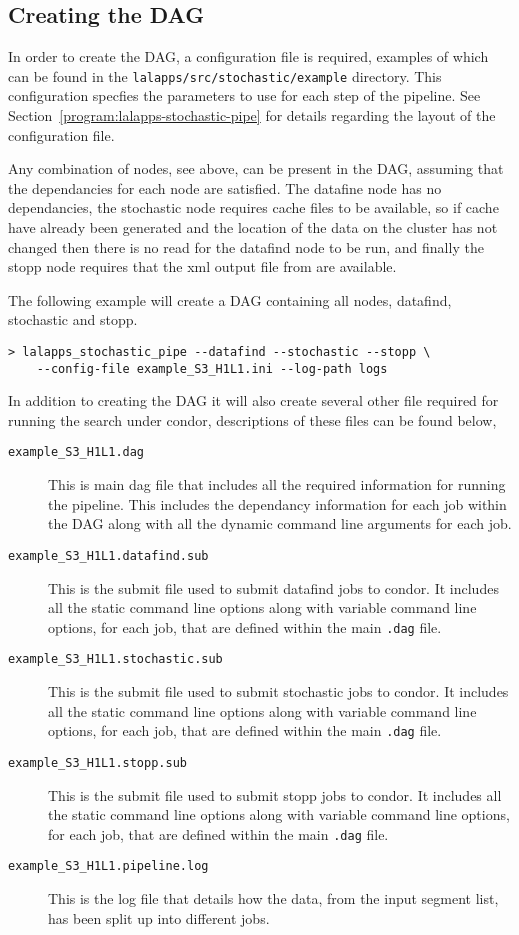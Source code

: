 \subsection{Creating the DAG}

In order to create the DAG, a configuration file is required, examples
of which can be found in the \texttt{lalapps/src/stochastic/example}
directory. This configuration specfies the parameters to use for each
step of the pipeline. See Section~\ref{program:lalapps-stochastic-pipe}
for details regarding the layout of the configuration file.

Any combination of nodes, see above, can be present in the DAG, assuming
that the dependancies for each node are satisfied. The datafine node has
no dependancies, the stochastic node requires cache files to be
available, so if cache have already been generated and the location of
the data on the cluster has not changed then there is no read for the
datafind node to be run, and finally the stopp node requires that the
xml output file from  are available.

The following example will create a DAG containing all nodes, datafind,
stochastic and stopp.

\begin{verbatim}
> lalapps_stochastic_pipe --datafind --stochastic --stopp \
    --config-file example_S3_H1L1.ini --log-path logs
\end{verbatim}

In addition to creating the DAG it will also create several other file
required for running the search under condor, descriptions of these
files can be found below,

\begin{description}
\item[\texttt{example\_S3\_H1L1.dag}]
This is main dag file that includes all the required information for
running the pipeline. This includes the dependancy information for each
job within the DAG along with all the dynamic command line arguments for
each job.
\item[\texttt{example\_S3\_H1L1.datafind.sub}]
This is the submit file used to submit datafind jobs to condor. It
includes all the static command line options along with variable command
line options, for each job, that are defined within the main
\texttt{.dag} file.
\item[\texttt{example\_S3\_H1L1.stochastic.sub}]
This is the submit file used to submit stochastic jobs to condor. It
includes all the static command line options along with variable command
line options, for each job, that are defined within the main
\texttt{.dag} file.
\item[\texttt{example\_S3\_H1L1.stopp.sub}]
This is the submit file used to submit stopp jobs to condor. It
includes all the static command line options along with variable command
line options, for each job, that are defined within the main
\texttt{.dag} file.
\item[\texttt{example\_S3\_H1L1.pipeline.log}]
This is the log file that details how the data, from the input segment
list, has been split up into different jobs.
\end{description}

